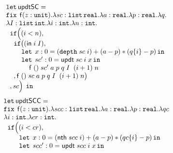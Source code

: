 \begin{figure}
\small
\[
\begin{array}{l}
\mathop{\mathtt{let}} \mathsf{updtSC} =\\
                 \mathop{\mathtt{fix}} \;  \mathsf{f}(z: \mathtt{unit}). \lambda sc: \mathtt{list} \, \mathtt{real}. 
                 \lambda a: \mathtt{real}. \lambda p: \mathtt{real}. \lambda q.\\
                 \lambda I: \mathtt{list} \, \mathtt{int}. \lambda i: \mathtt{int}. \lambda n: \mathtt{int}. \\
 \hspace{.2cm}   \mathtt{if} \Big ( (i < n)  ,  \\
 \hspace{0.4cm}  \mathtt{if} \big( ( \mathsf{in} \; i \; I  ) ,       \\
 \hspace{0.8cm}  \mathop{\mathtt{let}} \; x: 0 =( \mathtt{depth}_{\;} sc \; i) 
                 + (a-p)*(q \{ i\} - p)  \mathop{ \mathtt{in}} \\
 \hspace{0.8cm}  \mathop{\mathtt{let}} \; sc': 0 =  \mathsf{updt} \; sc \; i
                 \; x \mathop{ \mathtt{in}} \\
 \hspace{1.2cm}  \mathsf{f}  \; () \; sc' \; a \; p
                 \; q \; I \;  \; (i+1) \; n  \\ 
 \hspace{0.4cm}  , \mathsf{f}  \; () \; sc \; a \; p
                 \; q \; I \;  \; (i+1) \; n \big )  \\ 
 \hspace{0.2cm}  , sc  \Big ) \; \mathop{ \mathtt{in}}
\end{array}
\]
%
%
\[
\begin{array}{l}
\mathop{\mathtt{let}} \mathsf{updtSCC} = \\
                \mathop{\mathtt{fix}} \;  \mathsf{f}(z: \mathtt{unit}). \lambda scc: \mathtt{list} \, \mathtt{real}. \lambda a: \mathtt{real}. 
                \lambda p: \mathtt{real}. \lambda qc\\ 
                \lambda i: \mathtt{int}. \lambda cr: \mathtt{int}. \\
 \hspace{.2cm}  \mathtt{if} \Big ( (i < cr) ,  \\
 \hspace{0.8cm} \mathop{\mathtt{let}} \; x: 0 =( \mathsf{nth} \; scc \; i) 
                + (a-p)*(qc \{ i\} - p)  \mathop{ \mathtt{in}} \\
 \hspace{0.8cm} \mathop{\mathtt{let}} \; scc': 0 =  \mathsf{updt} \; scc \; i
                \; x \mathop{ \mathtt{in}} \\

\end{array}\]
\end{figure}
